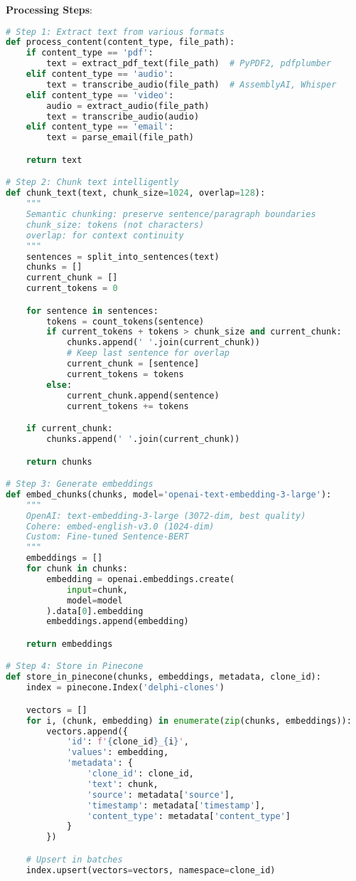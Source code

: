 \documentclass[10pt]{article}
\begin{document}
\textbf{Processing Steps}:
\begin{lstlisting}[language=Python]
# Step 1: Extract text from various formats
def process_content(content_type, file_path):
    if content_type == 'pdf':
        text = extract_pdf_text(file_path)  # PyPDF2, pdfplumber
    elif content_type == 'audio':
        text = transcribe_audio(file_path)  # AssemblyAI, Whisper
    elif content_type == 'video':
        audio = extract_audio(file_path)
        text = transcribe_audio(audio)
    elif content_type == 'email':
        text = parse_email(file_path)

    return text

# Step 2: Chunk text intelligently
def chunk_text(text, chunk_size=1024, overlap=128):
    """
    Semantic chunking: preserve sentence/paragraph boundaries
    chunk_size: tokens (not characters)
    overlap: for context continuity
    """
    sentences = split_into_sentences(text)
    chunks = []
    current_chunk = []
    current_tokens = 0

    for sentence in sentences:
        tokens = count_tokens(sentence)
        if current_tokens + tokens > chunk_size and current_chunk:
            chunks.append(' '.join(current_chunk))
            # Keep last sentence for overlap
            current_chunk = [sentence]
            current_tokens = tokens
        else:
            current_chunk.append(sentence)
            current_tokens += tokens

    if current_chunk:
        chunks.append(' '.join(current_chunk))

    return chunks

# Step 3: Generate embeddings
def embed_chunks(chunks, model='openai-text-embedding-3-large'):
    """
    OpenAI: text-embedding-3-large (3072-dim, best quality)
    Cohere: embed-english-v3.0 (1024-dim)
    Custom: Fine-tuned Sentence-BERT
    """
    embeddings = []
    for chunk in chunks:
        embedding = openai.embeddings.create(
            input=chunk,
            model=model
        ).data[0].embedding
        embeddings.append(embedding)

    return embeddings

# Step 4: Store in Pinecone
def store_in_pinecone(chunks, embeddings, metadata, clone_id):
    index = pinecone.Index('delphi-clones')

    vectors = []
    for i, (chunk, embedding) in enumerate(zip(chunks, embeddings)):
        vectors.append({
            'id': f'{clone_id}_{i}',
            'values': embedding,
            'metadata': {
                'clone_id': clone_id,
                'text': chunk,
                'source': metadata['source'],
                'timestamp': metadata['timestamp'],
                'content_type': metadata['content_type']
            }
        })

    # Upsert in batches
    index.upsert(vectors=vectors, namespace=clone_id)
\end{lstlisting}
\end{document}
